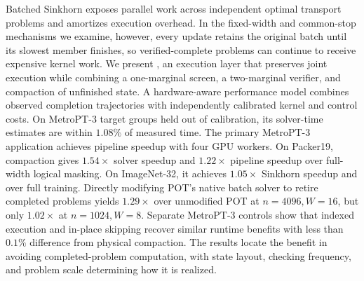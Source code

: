Batched Sinkhorn exposes parallel work across independent optimal transport problems and amortizes execution overhead. In the fixed-width and common-stop mechanisms we examine, however, every update retains the original batch until its slowest member finishes, so verified-complete problems can continue to receive expensive kernel work. We present \policy{}, an execution layer that preserves joint execution while combining a one-marginal screen, a two-marginal verifier, and compaction of unfinished state. A hardware-aware performance model combines observed completion trajectories with independently calibrated kernel and control costs. On MetroPT-3 target groups held out of calibration, its solver-time estimates are within $1.08\%$ of measured time. The primary MetroPT-3 application achieves \CMetroCorrectedEndpointSpeedup{} pipeline speedup with four GPU workers. On Packer19, compaction gives $1.54\times$ solver speedup and $1.22\times$ pipeline speedup over full-width logical masking. On ImageNet-32, it achieves $1.05\times$ Sinkhorn speedup and \CFeatureTrainingActiveOverStatic{} over full training. Directly modifying POT's native batch solver to retire completed problems yields $1.29\times$ over unmodified POT at $n=4096,W=16$, but only $1.02\times$ at $n=1024,W=8$. Separate MetroPT-3 controls show that indexed execution and in-place skipping recover similar runtime benefits with less than $0.1\%$ difference from physical compaction. The results locate the benefit in avoiding completed-problem computation, with state layout, checking frequency, and problem scale determining how it is realized.
